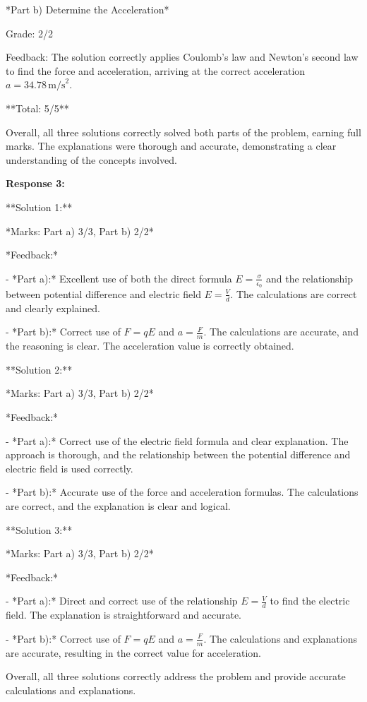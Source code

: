 \documentclass[a4paper,11pt]{article}
\begin{document}
*Part b) Determine the Acceleration*

Grade: 2/2

Feedback: The solution correctly applies Coulomb's law and Newton's second law to find the force and acceleration, arriving at the correct acceleration \( a = 34.78 \, \text{m/s}^2 \).

**Total: 5/5**

Overall, all three solutions correctly solved both parts of the problem, earning full marks. The explanations were thorough and accurate, demonstrating a clear understanding of the concepts involved.

\bigskip
\textbf{Response 3:}

**Solution 1:**

*Marks: Part a) 3/3, Part b) 2/2*

*Feedback:*

- *Part a):* Excellent use of both the direct formula \( E = \frac{\sigma}{\epsilon_0} \) and the relationship between potential difference and electric field \( E = \frac{V}{d} \). The calculations are correct and clearly explained.

- *Part b):* Correct use of \( F = qE \) and \( a = \frac{F}{m} \). The calculations are accurate, and the reasoning is clear. The acceleration value is correctly obtained.

**Solution 2:**

*Marks: Part a) 3/3, Part b) 2/2*

*Feedback:*

- *Part a):* Correct use of the electric field formula and clear explanation. The approach is thorough, and the relationship between the potential difference and electric field is used correctly.

- *Part b):* Accurate use of the force and acceleration formulas. The calculations are correct, and the explanation is clear and logical.

**Solution 3:**

*Marks: Part a) 3/3, Part b) 2/2*

*Feedback:*

- *Part a):* Direct and correct use of the relationship \( E = \frac{V}{d} \) to find the electric field. The explanation is straightforward and accurate.

- *Part b):* Correct use of \( F = qE \) and \( a = \frac{F}{m} \). The calculations and explanations are accurate, resulting in the correct value for acceleration.

Overall, all three solutions correctly address the problem and provide accurate calculations and explanations.
\end{document}
